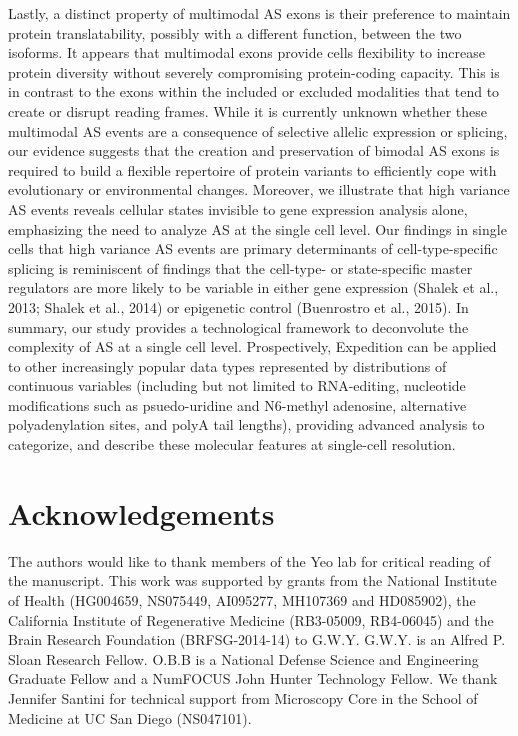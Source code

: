 Lastly, a distinct property of multimodal AS exons is their preference to maintain protein translatability, possibly with a different function, between the two isoforms. It appears that multimodal exons provide cells flexibility to increase protein diversity without severely compromising protein-coding capacity. This is in contrast to the exons within the included or excluded modalities that tend to create or disrupt reading frames. While it is currently unknown whether these multimodal AS events are a consequence of selective allelic expression or splicing, our evidence suggests that the creation and preservation of bimodal AS exons is required to build a flexible repertoire of protein variants to efficiently cope with evolutionary or environmental changes. Moreover, we illustrate that high variance AS events reveals cellular states invisible to gene expression analysis alone, emphasizing the need to analyze AS at the single cell level. Our findings in single cells that high variance AS events are primary determinants of cell-type-specific splicing is reminiscent of findings that the cell-type- or state-specific master regulators are more likely to be variable in either gene expression (Shalek et al., 2013; Shalek et al., 2014) or epigenetic control (Buenrostro et al., 2015).
In summary, our study provides a technological framework to deconvolute the complexity of AS at a single cell level. Prospectively, Expedition can be applied to other increasingly popular data types represented by distributions of continuous variables (including but not limited to RNA-editing, nucleotide modifications such as psuedo-uridine and N6-methyl adenosine, alternative polyadenylation sites, and polyA tail lengths), providing advanced analysis to categorize, and describe these molecular features at single-cell resolution. 

\section{Acknowledgements}
The authors would like to thank members of the Yeo lab for critical reading of the manuscript.  This work was supported by grants from the National Institute of Health (HG004659, NS075449, AI095277, MH107369 and HD085902), the California Institute of Regenerative Medicine (RB3-05009, RB4-06045) and the Brain Research Foundation (BRFSG-2014-14) to G.W.Y. G.W.Y. is an Alfred P. Sloan Research Fellow. O.B.B is a National Defense Science and Engineering Graduate Fellow and a NumFOCUS John Hunter Technology Fellow. We thank Jennifer Santini for technical support from Microscopy Core in the School of Medicine at UC San Diego (NS047101).